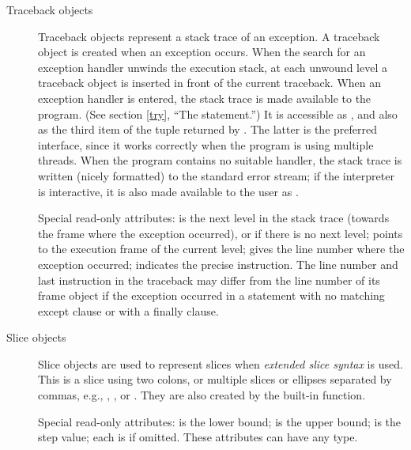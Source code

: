 \begin{description}
\begin{description}
\item[Traceback objects] \label{traceback}
Traceback objects represent a stack trace of an exception.  A
traceback object is created when an exception occurs.  When the search
for an exception handler unwinds the execution stack, at each unwound
level a traceback object is inserted in front of the current
traceback.  When an exception handler is entered, the stack trace is
made available to the program.
(See section \ref{try}, ``The  statement.'')
It is accessible as , and also as the third
item of the tuple returned by .  The latter is
the preferred interface, since it works correctly when the program is
using multiple threads.
When the program contains no suitable handler, the stack trace is written
(nicely formatted) to the standard error stream; if the interpreter is
interactive, it is also made available to the user as
.

Special read-only attributes:  is the next level in the
stack trace (towards the frame where the exception occurred), or
 if there is no next level;  points to the
execution frame of the current level;  gives the line
number where the exception occurred;  indicates the
precise instruction.  The line number and last instruction in the
traceback may differ from the line number of its frame object if the
exception occurred in a  statement with no matching
except clause or with a finally clause.

\item[Slice objects]
Slice objects are used to represent slices when \emph{extended slice
syntax} is used.  This is a slice using two colons, or multiple slices
or ellipses separated by commas, e.g., , , or .  They are also created by the built-in
 function.

Special read-only attributes:  is the lower bound;
 is the upper bound;  is the step value; each is
 if omitted. These attributes can have any type.

\end{description} %

\end{description} %



